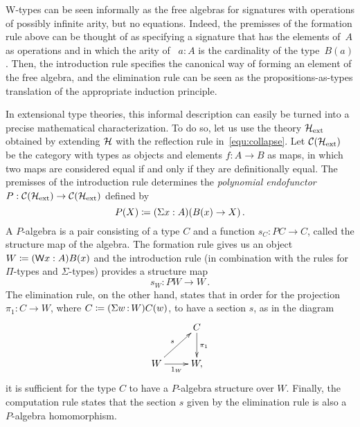 \noindent


\medskip

W-types can be seen informally as the free algebras for signatures
with operations of possibly infinite arity, but no equations. Indeed, the premisses 
of the formation rule above can be thought of as specifying a signature that has the elements of~$A$ 
as operations and in which the arity of~ $a : A$ is the cardinality of the type~$B(a)$. Then, the introduction rule specifies the canonical way of forming an element of the free algebra, and the elimination rule can be seen as the propositions-as-types translation of the appropriate induction principle.

In extensional type theories, this informal description can easily be turned into a precise
mathematical characterization. To do so, let us use the theory $\mathcal{H}_{\mathrm{ext}}$ obtained
by extending $\mathcal{H}$ with the reflection rule in~\eqref{equ:collapse}. Let $\mathcal{C}(\mathcal{H}_{\mathrm{ext}})$ be the category with
types as objects and elements $f : A \rightarrow B$ as maps, in which two maps are
considered equal if and only if they are definitionally equal. The premisses of the introduction
rule determines the \emph{polynomial endofunctor} $P : \mathcal{C}(\mathcal{H}_{\mathrm{ext}}) \rightarrow \mathcal{C}(\mathcal{H}_{\mathrm{ext}})$
defined by 
\[
    P(X) \coloneqq (\Sigma x : A ) (B(x) \rightarrow X) \, .
\]
A $P$-algebra is a pair consisting of a type $C$ and a function $s_C : PC \rightarrow C$, called 
the structure map of the algebra. The formation rule gives us an object $W \coloneqq (\mathsf{W} x : A)
B(x)$ and the introduction rule (in combination with the rules for $\Pi$-types
and $\Sigma$-types) provides a structure map
\[
s_W : PW \rightarrow W \, .
\]
The elimination rule, on the other hand, states that in order for the projection $\pi_1 \colon C \rightarrow W$, where
$C \coloneqq (\Sigma w {\, : \, } W) C(w)$, to have a section $s$, as in the diagram
\[
\xymatrix{
& C  \ar[d]^{\pi_1} \\
W \ar[ru]^{s} \ar[r]_{1_W} & W, 
}
\]
it is sufficient for the type $C$ to have a $P$-algebra structure over $W$. Finally, the computation rule states that the section $s$ given by the elimination rule is also a $P$-algebra homomorphism. 

